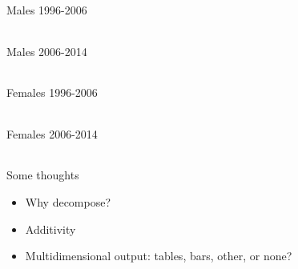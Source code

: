 \documentclass[20pt,usenames,dvipsnames]{beamer}
\begin{document}
\begin{frame}[plain]
\Large
\begin{center}
Males 1996-2006
\vspace{1em}

 \begin{tabular}{rrr|r}
      
     \end{tabular}
     \end{center}
\end{frame}
\begin{frame}[plain]
\Large
\begin{center}
Males 2006-2014
\vspace{1em}

      \begin{tabular}{rrr|r}
      
     \end{tabular}
     \end{center}
\end{frame}
  
  
\begin{frame}[plain]
\Large
\begin{center}
Females 1996-2006
\vspace{1em}

 \begin{tabular}{rrr|r}
      
     \end{tabular}
      \end{center}
\end{frame}
\begin{frame}[plain]
\Large
\begin{center}
Females 2006-2014

\vspace{1em}
      \begin{tabular}{rrr|r}
      
     \end{tabular}
     \end{center}
\end{frame}     
 
\begin{frame}[plain]
\Large
\begin{center}
Some thoughts
\begin{itemize}
\item Why decompose?
\item Additivity
\item Multidimensional output: tables, bars, other, or none?
\end{itemize}
\end{center}
\end{frame}
\end{document}
